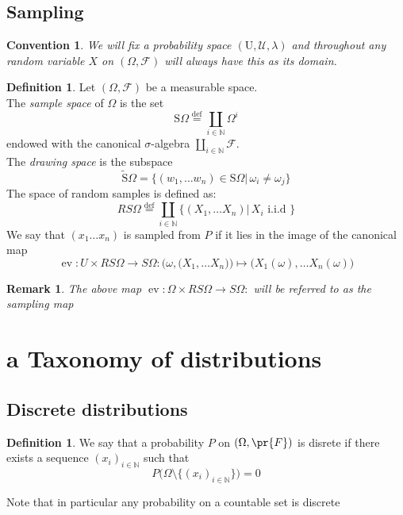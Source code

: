 \documentclass{book}
\theoremstyle{plain}
\newtheorem{convention}[corollary]{Convention}
\newtheorem{remark}[corollary]{Remark}
\theoremstyle{definition}
\newtheorem{definition}[corollary]{Definition}
\renewcommand{\d}[1]{\mathbb{#1}}
\newcommand{\define}{\stackrel{\operatorname{def}}{=}}
\newcommand{\draw}[1]{\widetilde{\textrm{S}} #1}
\newcommand{\fun}{\mapsto}
\DeclareMathOperator{\ev}{ev}
\newcommand{\mor}{\longrightarrow}
\renewcommand{\r}[1]{\mathcal{#1}}
\newcommand{\sample}[1]{\textrm{S} #1}
\begin{document}
\subsection{Sampling}

\begin{convention}\label{conv:prob_univ}
We will fix a probability space $(\textrm{U}, \r{U},\lambda)$ and throughout any random variable $X$ on $(\Omega,\r{F})$ will always have this as its domain.
\end{convention}

\begin{definition}\label{mb:prob:def:sampling}
Let $(\Omega, \r{F})$ be a measurable space.\\
The \emph{sample space} of $\Omega$ is the set 
\[
\sample{\Omega}\define \coprod_{i \in \d{N}}\Omega^i
\]
endowed with the canonical $\sigma$-algebra $\coprod_{i \in \d{N}} \r{F}$.\\
The \emph{drawing space} is the subspace
\[
\draw{\Omega} = \big\{ (w_1,\ldots w_n) \in \sample{\Omega} \vert \, \omega_i\neq \omega_j \big\}
\]
The space of random samples is defined as:
\[
RS\Omega\define  \coprod_{i \in \d{N}} \bigg\{(X_1,\ldots X_n)\vert \, X_i \textrm{ i.i.d }\}
\] 
We say that $(x_1\ldots x_n)$ is sampled from $P$ if it lies in the image of the canonical map
\[
\ev: U\times RS\Omega\mor S\Omega: \bigg(\omega, \big(X_1,\ldots X_n\big)\bigg)\fun \bigg(X_1(\omega),\ldots X_n(\omega)\bigg)
\]
\end{definition}


\begin{remark}\label{rem:prob_sampling-map}
The above map $\ev: \Omega\times RS\Omega\mor S\Omega: $
will be referred to as the sampling map
\end{remark}


\section{a Taxonomy of distributions}
\subsection{Discrete distributions}
\begin{definition}
We say that a probability $P$ on $(\Omega,\pr{F})$ is disrete if there exists a sequence $(x_i)_{i \in \d{N}}$ such that
\[
P\big(\Omega\setminus\{(x_i)_{i \in \d{N}}\}\big)=0
\]
\end{definition}
Note that in particular any probability on a countable set is discrete
\end{document}
